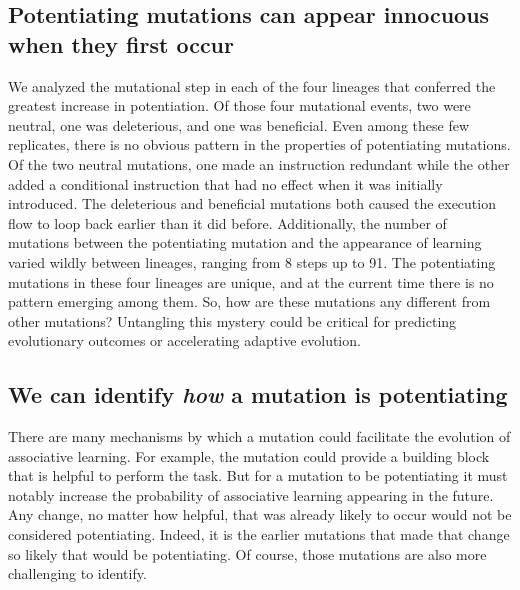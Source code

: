 \subsection{Potentiating mutations can appear innocuous when they first occur}

We analyzed the mutational step in each of the four lineages that conferred the greatest increase in potentiation.
Of those four mutational events, two were neutral, one was deleterious, and one was beneficial. 
Even among these few replicates, there is no obvious pattern in the properties of potentiating mutations. 
Of the two neutral mutations, one made an instruction redundant while the other added a conditional instruction that had no effect when it was initially introduced. 
The deleterious and beneficial mutations both caused the execution flow to loop back earlier than it did before.
Additionally, the number of mutations between the potentiating mutation and the appearance of learning varied wildly between lineages, ranging from 8 steps up to 91.
The potentiating mutations in these four lineages are unique, and at the current time there is no pattern emerging among them.
So, how are these mutations any different from other mutations?
Untangling this mystery could be critical for predicting evolutionary outcomes or accelerating adaptive evolution.


\subsection{We can identify \textit{how} a mutation is potentiating}

There are many mechanisms by which a mutation could facilitate the evolution of associative learning.
For example, the mutation could provide a building block that is helpful to perform the task.  
But for a mutation to be potentiating it must notably increase the probability of associative learning appearing in the future.
Any change, no matter how helpful, that was already likely to occur would not be considered potentiating.
Indeed, it is the earlier mutations that made that change so likely that would be potentiating.
Of course, those mutations are also more challenging to identify.

